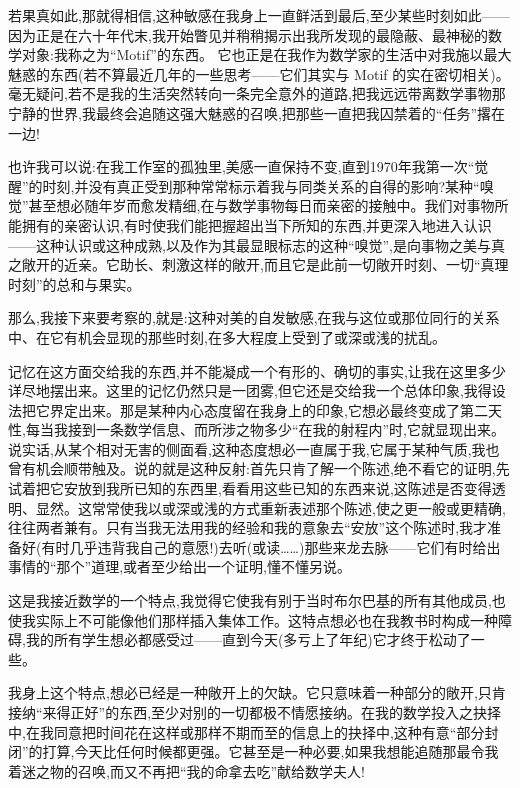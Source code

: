 若果真如此,那就得相信,这种敏感在我身上一直鲜活到最后,至少某些时刻如此——因为正是在六十年代末,我开始瞥见并稍稍揭示出我所发现的最隐蔽、最神秘的数学对象:我称之为“Motif”的东西。
 它也正是在我作为数学家的生活中对我施以最大魅惑的东西(若不算最近几年的一些思考——它们其实与 Motif 的实在密切相关)。毫无疑问,若不是我的生活突然转向一条完全意外的道路,把我远远带离数学事物那宁静的世界,我最终会追随这强大魅惑的召唤,把那些一直把我囚禁着的“任务”撂在一边!

也许我可以说:在我工作室的孤独里,美感一直保持不变,直到1970年我第一次“觉醒”的时刻,并没有真正受到那种常常标示着我与同类关系的自得的影响?某种“嗅觉”甚至想必随年岁而愈发精细,在与数学事物每日而亲密的接触中。我们对事物所能拥有的亲密认识,有时使我们能把握超出当下所知的东西,并更深入地进入认识——这种认识或这种成熟,以及作为其最显眼标志的这种“嗅觉”,是向事物之美与真之敞开的近亲。它助长、刺激这样的敞开,而且它是此前一切敞开时刻、一切“真理时刻”的总和与果实。

那么,我接下来要考察的,就是:这种对美的自发敏感,在我与这位或那位同行的关系中、在它有机会显现的那些时刻,在多大程度上受到了或深或浅的扰乱。

记忆在这方面交给我的东西,并不能凝成一个有形的、确切的事实,让我在这里多少详尽地摆出来。这里的记忆仍然只是一团雾,但它还是交给我一个总体印象,我得设法把它界定出来。那是某种内心态度留在我身上的印象,它想必最终变成了第二天性,每当我接到一条数学信息、而所涉之物多少“在我的射程内”时,它就显现出来。说实话,从某个相对无害的侧面看,这种态度想必一直属于我,它属于某种气质,我也曾有机会顺带触及。说的就是这种反射:首先只肯了解一个陈述,绝不看它的证明,先试着把它安放到我所已知的东西里,看看用这些已知的东西来说,这陈述是否变得透明、显然。这常常使我以或深或浅的方式重新表述那个陈述,使之更一般或更精确,往往两者兼有。只有当我无法用我的经验和我的意象去“安放”这个陈述时,我才准备好(有时几乎违背我自己的意愿!)去听(或读……)那些来龙去脉——它们有时给出事情的“那个”道理,或者至少给出一个证明,懂不懂另说。

这是我接近数学的一个特点,我觉得它使我有别于当时布尔巴基的所有其他成员,也使我实际上不可能像他们那样插入集体工作。这特点想必也在我教书时构成一种障碍,我的所有学生想必都感受过——直到今天(多亏上了年纪)它才终于松动了一些。

我身上这个特点,想必已经是一种敞开上的欠缺。它只意味着一种部分的敞开,只肯接纳“来得正好”的东西,至少对别的一切都极不情愿接纳。在我的数学投入之抉择中,在我同意把时间花在这样或那样不期而至的信息上的抉择中,这种有意“部分封闭”的打算,今天比任何时候都更强。它甚至是一种必要,如果我想能追随那最令我着迷之物的召唤,而又不再把“我的命拿去吃”献给数学夫人!

